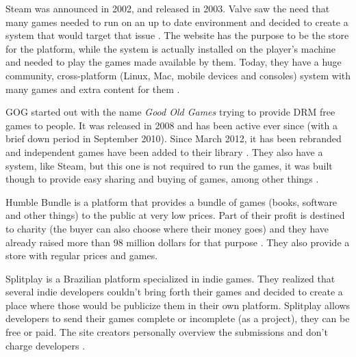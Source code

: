 Steam was announced in 2002, and released in 2003. Valve saw the need that many games needed to run on an up to date environment and decided to create a system that would target that issue \cite{wikipedia2017steam}. The website has the purpose to be the store for the platform, while the system is actually installed on the player's machine and needed to play the games made available by them. Today, they have a huge community, cross-platform (Linux, Mac, mobile devices and consoles) system with many games and extra content for them \cite{steam2017}.

GOG started out with the name \textit{Good Old Games} trying to provide DRM free games to people. It was released in 2008 and has been active ever since (with a brief down period in September 2010). Since March 2012, it has been rebranded and independent games have been added to their library \cite{wikipedia2017gog}. They also have a system, like Steam, but this one is not required to run the games, it was built though to provide easy sharing and buying of games, among other things \cite{gog2017}.

Humble Bundle is a platform that provides a bundle of games (books, software and other things) to the public at very low prices. Part of their profit is destined to charity (the buyer can also choose where their money goes) and they have already raised more than 98 million dollars for that purpose \cite{humblebundle2017}. They also provide a store with regular prices and games.

Splitplay is a Brazilian platform specialized in indie games. They realized that several indie developers couldn't bring forth their games and decided to create a place where those would be publicize them in their own platform. Splitplay allows developers to send their games complete or incomplete (as a project), they can be free or paid. The site creators personally overview the submissions and don't charge developers \cite{splitplay2017}.
